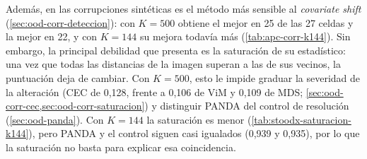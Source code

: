 
Además, en las corrupciones sintéticas \stoodx es el método más sensible al \emph{covariate shift} (\cref{sec:ood-corr-deteccion}): con $K = 500$ obtiene el mejor \AUROC en 25 de las 27 celdas y la mejor  en 22, y con $K = 144$ su  mejora todavía más (\cref{tab:apc-corr-k144}). Sin embargo, la principal debilidad que presenta es la saturación de su estadístico: una vez que todas las distancias de la imagen superan a las de sus vecinos, la puntuación deja de cambiar. Con $K = 500$, esto le impide graduar la severidad de la alteración (CEC de 0,128, frente a 0,106 de ViM y 0,109 de MDS; \cref{sec:ood-corr-cec,sec:ood-corr-saturacion}) y distinguir PANDA del control de resolución (\cref{sec:ood-panda}). Con $K = 144$ la saturación es menor (\cref{tab:stoodx-saturacion-k144}), pero PANDA y el control siguen casi igualados (0,939 y 0,935), por lo que la saturación no basta para explicar esa coincidencia.

